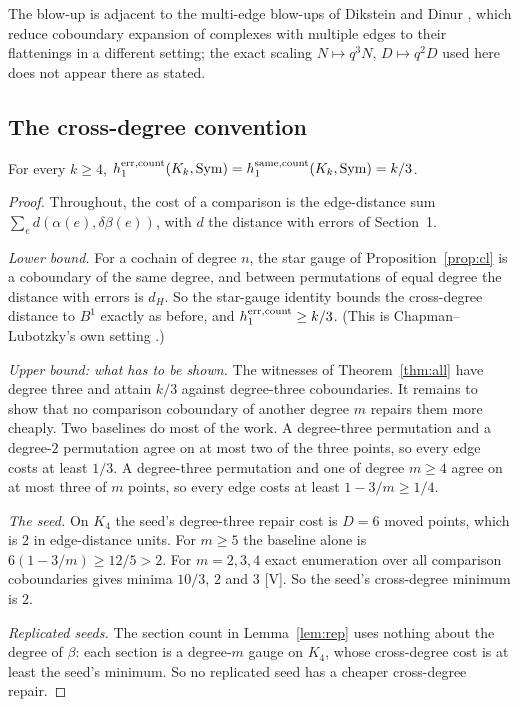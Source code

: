 \documentclass[11pt]{article}
\theoremstyle{remark}\newtheorem{remark}[theorem]{Remark}
\newcommand{\Sym}{\mathrm{Sym}}\newcommand{\dH}{d_H}\newcommand{\F}{\mathbb{F}}\newcommand{\Z}{\mathbb{Z}}
\begin{document}
 The blow-up is adjacent to the multi-edge blow-ups of Dikstein and Dinur \cite{DD}, which reduce coboundary expansion of complexes with multiple edges to their flattenings in a different setting; the exact scaling $N\mapsto q^3N$, $D\mapsto q^2D$ used here does not appear there as stated.

\subsection{The cross-degree convention}\label{sec:crossdeg}
\begin{proposition}[T+V+C]\label{prop:crossdeg}
For every $k\ge4$, $h_1^{\rm err,count}(K_k,\Sym)=h_1^{\rm same,count}(K_k,\Sym)=k/3$.
\end{proposition}
\begin{proof}
Throughout, the cost of a comparison is the edge-distance sum $\sum_e d(\alpha(e),\delta\beta(e))$, with $d$ the distance with errors of Section~1.

\emph{Lower bound.} For a cochain of degree $n$, the star gauge of Proposition~\ref{prop:cl} is a coboundary of the same degree, and between permutations of equal degree the distance with errors is $\dH$. So the star-gauge identity bounds the cross-degree distance to $B^1$ exactly as before, and $h_1^{\rm err,count}\ge k/3$. (This is Chapman--Lubotzky's own setting \cite{CL1,CL2}.)

\emph{Upper bound: what has to be shown.} The witnesses of Theorem~\ref{thm:all} have degree three and attain $k/3$ against degree-three coboundaries. It remains to show that no comparison coboundary of another degree $m$ repairs them more cheaply. Two baselines do most of the work. A degree-three permutation and a degree-$2$ permutation agree on at most two of the three points, so every edge costs at least $1/3$. A degree-three permutation and one of degree $m\ge4$ agree on at most three of $m$ points, so every edge costs at least $1-3/m\ge1/4$.

\emph{The seed.} On $K_4$ the seed's degree-three repair cost is $D=6$ moved points, which is $2$ in edge-distance units. For $m\ge5$ the baseline alone is $6(1-3/m)\ge12/5>2$. For $m=2,3,4$ exact enumeration over all comparison coboundaries gives minima $10/3$, $2$ and $3$ [V]. So the seed's cross-degree minimum is $2$.

\emph{Replicated seeds.} The section count in Lemma~\ref{lem:rep} uses nothing about the degree of $\beta$: each section is a degree-$m$ gauge on $K_4$, whose cross-degree cost is at least the seed's minimum. So no replicated seed has a cheaper cross-degree repair.


\end{proof}
\end{document}
